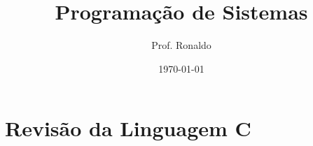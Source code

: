 \documentclass[12pt]{article}
\title{Programação de Sistemas}
\author{Prof. Ronaldo}
\date{\today}
\begin{document}
\maketitle
\tableofcontents

\section{Revisão da Linguagem C}
\end{document}
